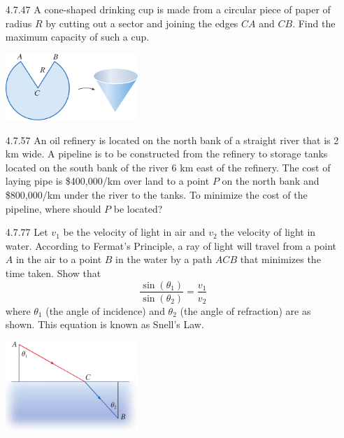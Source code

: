 \documentclass{article}
\begin{document}
\begin{enumerate}
\newpage

\item[4.7.47]
    A cone-shaped drinking cup is made from a circular piece of paper of
    radius $R$ by cutting out a sector and joining the edges $CA$ and $CB$.
    Find the maximum capacity of such a cup.

    \begin{center}
        \includegraphics[width=5cm]{./png/4.7.47.png}
    \end{center}

\vspace{6cm}


\item[4.7.57]
    An oil refinery is located on the north bank of a straight river that is 2
    km wide. A pipeline is to be constructed from the refinery to storage tanks
    located on the south bank of the river 6 km east of the refinery. The cost
    of laying pipe is \$400,000/km over land to a point $P$ on the north bank
    and \$800,000/km under the river to the tanks. To minimize the cost of the
    pipeline, where should $P$ be located?

\newpage

\item[4.7.77]
    Let $v_1$ be the velocity of light in air and $v_2$ the velocity of light
    in water. According to Fermat's Principle, a ray of light will travel from
    a point $A$ in the air to a point $B$ in the water by a path $ACB$ that
    minimizes the time taken. Show that
    \[
        \frac{\sin ( \theta_{1} )}{\sin ( \theta_{2} )} = \frac{v_1}{v_2}
    \]
    where $\theta_{1}$ (the angle of incidence) and $ \theta_{2}$ (the angle of
    refraction) are as shown. This equation is known as Snell's Law.

    \begin{center}
        \includegraphics[width=5cm]{./png/4.7.77.png}
    \end{center}


\end{enumerate}
\end{document}
